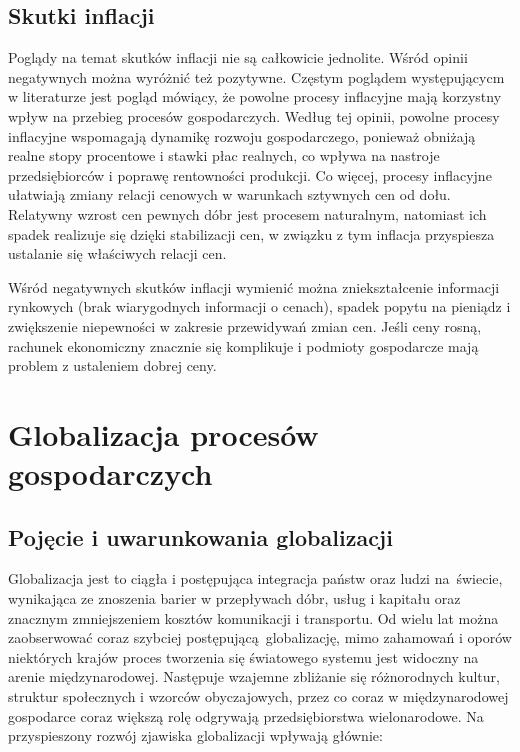 \documentclass[12pt]{extarticle}
\begin{document}
\subsection{Skutki inflacji}

Poglądy na temat skutków inflacji nie są całkowicie jednolite. Wśród opinii negatywnych można wyróżnić też pozytywne. Częstym poglądem występującycm w literaturze jest pogląd mówiący, że powolne procesy inflacyjne mają korzystny wpływ na przebieg procesów gospodarczych. Według tej opinii, powolne procesy inflacyjne wspomagają dynamikę rozwoju gospodarczego, ponieważ obniżają realne stopy procentowe i stawki płac realnych, co wpływa na nastroje przedsiębiorców i poprawę rentowności produkcji. Co więcej, procesy inflacyjne ułatwiają zmiany relacji cenowych w warunkach sztywnych cen od dołu. Relatywny wzrost cen pewnych dóbr jest procesem naturalnym, natomiast ich spadek realizuje się dzięki stabilizacji cen, w związku z tym inflacja przyspiesza ustalanie się właściwych relacji cen.

Wśród negatywnych skutków inflacji wymienić można zniekształcenie informacji rynkowych (brak wiarygodnych informacji o cenach), spadek popytu na pieniądz i zwiększenie niepewności w zakresie przewidywań zmian cen. Jeśli ceny rosną, rachunek ekonomiczny znacznie się komplikuje i podmioty gospodarcze mają problem z ustaleniem dobrej ceny.

\section{Globalizacja procesów gospodarczych}

\subsection{Pojęcie i uwarunkowania globalizacji}

Globalizacja jest to ciągła i postępująca integracja państw oraz ludzi na świecie, wynikająca ze znoszenia barier w przepływach dóbr, usług i kapitału oraz znacznym zmniejszeniem kosztów komunikacji i transportu. Od wielu lat można zaobserwować coraz szybciej postępującą globalizację, mimo zahamowań i oporów niektórych krajów proces tworzenia się światowego systemu jest widoczny na arenie międzynarodowej. Następuje wzajemne zbliżanie się różnorodnych kultur, struktur społecznych i wzorców obyczajowych, przez co coraz w międzynarodowej gospodarce coraz większą rolę odgrywają przedsiębiorstwa wielonarodowe. Na przyspieszony rozwój zjawiska globalizacji wpływają głównie:
\end{document}

